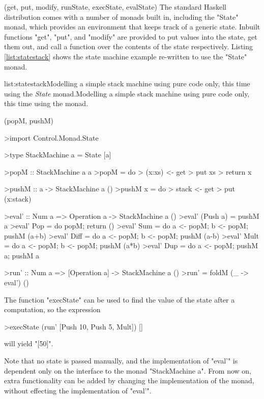 \functions(get, put, modify, runState, execState, evalState)
The standard Haskell distribution comes with a number of monads built in, including the "State" monad, which provides an environment that keeps track of a generic state. Inbuilt functions "get", "put", and "modify" are provided to put values into the state, get them out, and call a function over the contents of the state respectively. Listing \ref{list:statestack} shows the state machine example re-written to use the "State" monad.

\vspace{-0.5em}
\begin{listing}{list:statestack}{Modelling a simple stack machine using pure code only, this time using the \emph{State} monad.}{Modelling a simple stack machine using pure code only, this time using the  monad.}{}
\end{listing}\vspace{-1.5em}

\functions(popM, pushM)
\begin{haskell}

>import Control.Monad.State

>type StackMachine a = State [a]

>popM :: StackMachine a a
>popM = do
>  (x:xs) <- get
>  put xs
>  return x

>pushM :: a -> StackMachine a ()
>pushM x = do
>  stack <- get
>  put (x:stack)

>eval' :: Num a => Operation a -> StackMachine a ()
>eval' (Push a) = pushM a
>eval' Pop  = do popM; return ()
>eval' Sum  = do a <- popM; b <- popM; pushM (a+b)
>eval' Diff = do a <- popM; b <- popM; pushM (a-b)
>eval' Mult = do a <- popM; b <- popM; pushM (a*b)
>eval' Dup  = do a <- popM; pushM a; pushM a

>run' :: Num a => [Operation a] -> StackMachine a ()
>run' = foldM (\_ -> eval') ()

\end{haskell}
\noindent The function "execState" can be used to find the value of the state after a computation, so the expression

\begin{haskell}

>execState (run' [Push 10, Push 5, Mult]) []

\end{haskell}
\noindent will yield "[50]".

Note that no state is passed manually, and the implementation of "eval'" is dependent only on the interface to the monad "StackMachine a". From now on, extra functionality can be added by changing the implementation of the monad, without effecting the implementation of "eval'". 

